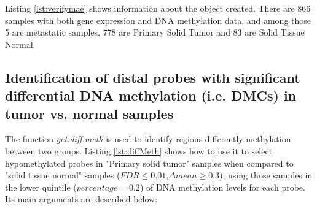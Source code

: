 %

Listing \ref{lst:verifymae} shows information about the object created. There are 866 samples with both gene expression and DNA methylation data,
and among those 5 are metastatic samples, 778 are Primary Solid Tumor and 83 are Solid Tissue Normal.

%



\subsection*{Identification of distal probes with significant differential DNA methylation (i.e. DMCs) in tumor vs. normal samples}

The function \textit{get.diff.meth} is  used to identify regions differently methylation between two groups.  Listing \ref{lst:diffMeth} shows how to use it to select hypomethylated probes in "Primary solid tumor" samples when compared to "solid tissue normal" samples  ($FDR \leq 0.01$,$\Delta mean \geq 0.3$), using those samples in the lower quintile ($percentage = 0.2$) of DNA methylation levels for each probe. Its main arguments are described below:



